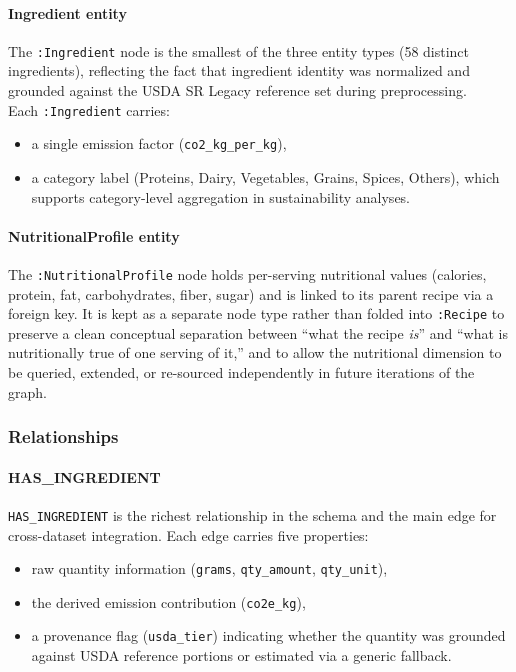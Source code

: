 \documentclass{article}
\begin{document}
\paragraph{Ingredient entity }
The \texttt{:Ingredient} node is the smallest of the three entity types (58 distinct ingredients), reflecting the fact that ingredient identity was normalized and grounded against the USDA SR Legacy reference set during preprocessing.
\\
Each \texttt{:Ingredient} carries:
\begin{itemize}
    \item a single emission factor (\texttt{co2\_kg\_per\_kg}),
    \item a category label (Proteins, Dairy, Vegetables, Grains, Spices, Others), which supports category-level aggregation in sustainability analyses.
\end{itemize}

\paragraph{NutritionalProfile entity}
The \texttt{:NutritionalProfile} node holds per-serving nutritional values (calories, protein, fat, carbohydrates, fiber, sugar) and is linked to its parent recipe via a foreign key. It is kept as a separate node type rather than folded into \texttt{:Recipe} to preserve a clean conceptual separation between ``what the recipe \emph{is}'' and ``what is nutritionally true of one serving of it,'' and to allow the nutritional dimension to be queried, extended, or re-sourced independently in future iterations of the graph.

\subsubsection{Relationships}

\paragraph{HAS\_INGREDIENT}
\texttt{HAS\_INGREDIENT} is the richest relationship in the schema and the main edge for cross-dataset integration. Each edge carries five properties:
\begin{itemize}
    \item raw quantity information (\texttt{grams}, \texttt{qty\_amount}, \texttt{qty\_unit}),
    \item the derived emission contribution (\texttt{co2e\_kg}),
    \item a provenance flag (\texttt{usda\_tier}) indicating whether the quantity was grounded against USDA reference portions or estimated via a generic fallback.
\end{itemize}
\end{document}
